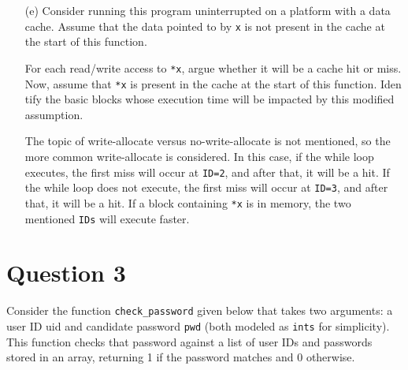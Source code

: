 \documentclass[12pt]{article}
\begin{document}
\begin{enumerate}
	
	\item [(e)]
	Consider running this program uninterrupted on a platform with a data cache.
	Assume that the data pointed to by \texttt{x} is not present in the cache at the start of
	this function.
	
	For each read/write access to \texttt{*x}, argue whether it will be a cache hit or miss.
	Now, assume that \texttt{*x} is present in the cache at the start of this function. Iden
	tify the basic blocks whose execution time will be impacted by this modified
	assumption.
	\begin{qsolve}
		The topic of write-allocate versus no-write-allocate is not mentioned, so the more common write-allocate is considered. In this case, if the while loop executes, the first miss will occur at \texttt{ID=2}, and after that, it will be a hit. If the while loop does not execute, the first miss will occur at \texttt{ID=3}, and after that, it will be a hit. If a block containing \texttt{*x} is in memory, the two mentioned \texttt{IDs} will execute faster.
	\end{qsolve}
\end{enumerate}
\vfil
\clearpage






\section{Question 3}
Consider the function \texttt{check\_password} given below that takes two arguments: a
user ID uid and candidate password \texttt{pwd} (both modeled as \texttt{ints} for simplicity).
This function checks that password against a list of user IDs and passwords stored
in an array, returning 1 if the password matches and 0 otherwise.
\end{document}
